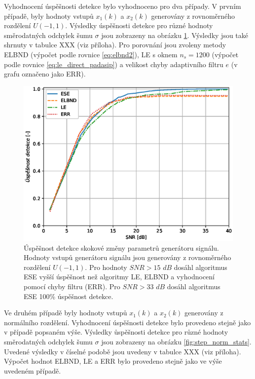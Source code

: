 Vyhodnocení úspěšnosti detekce bylo vyhodnoceno pro dva případy. V prvním případě, byly hodnoty vstupů $x_1(k)$ a $x_2(k)$ generovány z rovnoměrného rozdělení $U(-1,1)$. Výsledky úspěšnosti detekce pro různé hodnoty směrodatných odchylek šumu $\sigma$ jsou zobrazeny na obrázku \ref{fig:step_uni_stats}. Výsledky jsou také shrnuty v tabulce XXX (viz příloha). Pro porovnání jsou zvoleny metody ELBND (výpočet podle rovnice \ref{eq:elbnd2}), LE s oknem $n_s=1200$ (výpočet podle rovnice \ref{eq:le_direct_padasip}) a velikost chyby adaptivního filtru $e$ (v grafu označeno jako ERR).

\begin{figure}[!ht]
    \centering
    \includegraphics[scale=0.62]{IMG/mdpi/stepuni_stats.eps}
    \caption{Úspěšnost detekce skokové změny parametrů generátoru signálu. Hodnoty vstupů generátoru signálu jsou generovány z rovnoměrného rozdělení $U(-1,1)$. 
Pro hodnoty $SNR > 15$ $dB$ dosáhl algoritmus ESE vyšší úspěšnost než algoritmy  LE, ELBND a vyhodnocení pomocí chyby filtru (ERR). Pro $SNR > 33$ $dB$ dosáhl algoritmus ESE 100\% úspěšnost detekce.}
    \label{fig:step_uni_stats}
\end{figure}
Ve druhém případě byly hodnoty vstupů $x_1(k)$ a $x_2(k)$ generovány z normálního rozdělení. Vyhodnocení úspěšnosti detekce bylo provedeno stejně jako v případě popsaném výše. Výsledky ůspěšnosti detekce pro různé hodnoty směrodatných odchylek šumu $\sigma$ jsou zobrazeny na obrázku \ref{fig:step_norm_stats}. Uvedené výsledky v číselné podobě jsou uvedeny v tabulce XXX (viz příloha). Výpočet hodnot ELBND, LE a ERR bylo provedeno stejně jako ve výše uvedeném případě.


